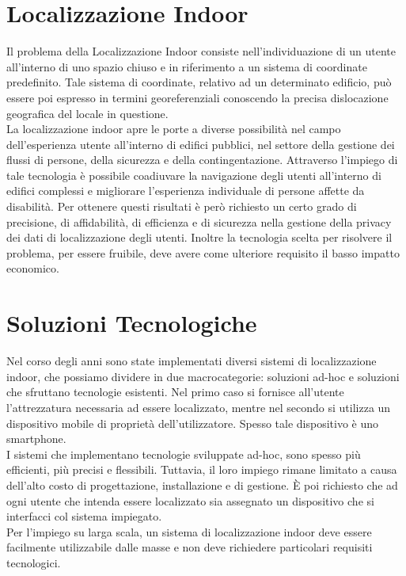 \documentclass[draft]{standalone}
\begin{document}
\section{Localizzazione Indoor}
Il problema della Localizzazione Indoor consiste nell'individuazione di un
utente all'interno di uno spazio chiuso e in riferimento a un sistema di
coordinate predefinito. Tale sistema di coordinate, relativo ad un determinato
edificio, può essere poi espresso in termini georeferenziali conoscendo la
precisa dislocazione geografica del locale in questione. \\
La localizzazione indoor apre le porte a diverse possibilità nel campo
dell'esperienza utente all'interno di edifici pubblici, nel settore
della gestione dei flussi di persone, della sicurezza e della contingentazione.
Attraverso l'impiego di tale tecnologia è possibile coadiuvare la navigazione
degli utenti all'interno di edifici complessi e migliorare l'esperienza
individuale di persone affette da disabilità. Per ottenere questi risultati è
però richiesto un certo grado di precisione, di affidabilità, di efficienza e
di sicurezza nella gestione della privacy dei dati di localizzazione degli
utenti. Inoltre la tecnologia scelta per risolvere il problema, per essere
fruibile, deve avere come ulteriore requisito il basso impatto economico.

\section{Soluzioni Tecnologiche}
Nel corso degli anni sono state implementati diversi sistemi di
localizzazione indoor, che possiamo dividere in due macrocategorie: soluzioni
ad-hoc e soluzioni che sfruttano tecnologie esistenti. Nel primo caso si
fornisce all'utente l'attrezzatura necessaria ad essere localizzato, mentre nel
secondo si utilizza un dispositivo mobile di proprietà dell'utilizzatore.
Spesso tale dispositivo è uno smartphone. \\ I sistemi che implementano
tecnologie sviluppate ad-hoc, sono spesso più efficienti, più precisi e
flessibili. Tuttavia, il loro impiego rimane limitato a causa dell'alto costo
di progettazione, installazione e di gestione. È poi richiesto che ad ogni
utente che intenda essere localizzato sia assegnato un dispositivo che si
interfacci col sistema impiegato. \\
Per l'impiego su larga scala, un sistema di localizzazione indoor deve essere
facilmente utilizzabile dalle masse e non deve richiedere particolari requisiti
tecnologici.  \\
\end{document}
